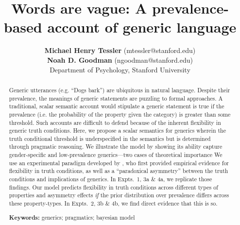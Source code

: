 \documentclass[10pt,letterpaper]{article}
\title{Words are vague: A prevalence-based account of generic language}
\author{{\large \bf Michael Henry Tessler} (mtessler@stanford.edu)\\ {\large \bf Noah D. Goodman} (ngoodman@stanford.edu) \\
  Department of Psychology, Stanford University}
\begin{document}
\maketitle


\begin{abstract}
Generic utterances (e.g. ``Dogs bark'') are ubiquitous in natural language. Despite their prevalence, the meanings of generic statements are puzzling to formal approaches. A traditional, scalar semantic account would stipulate a generic statement is true if the prevalence (i.e. the probability of the property given the category) is greater than some threshold. Such accounts are difficult to defend because of the inherent flexibility in generic truth conditions. Here, we propose a scalar semantics for generics wherein the truth conditional threshold is underspecified in the semantics but is determined through pragmatic reasoning.  We illustrate the model by showing its ability capture gender-specific and low-prevalence generics---two cases of theoretical importance
We use an experimental paradigm developed by , who first provided empirical evidence for flexibility in truth conditions, as well as a ``paradoxical asymmetry'' between the truth conditions and implications of generics. In Expts.~1, 3a \& 4a, we replicate those findings. Our model predicts flexibility in truth conditions across different types of properties and asymmetry effects \emph{if} the prior distribution over prevalence differs across these property-types.  In Expts.~2, 3b \& 4b, we find direct evidence that this is so.




\textbf{Keywords:} 
generics; pragmatics; bayesian model
\end{abstract}
\end{document}
